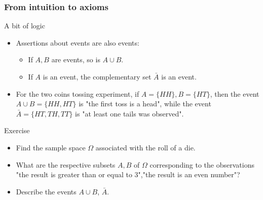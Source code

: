 \documentclass[main.tex]{subfiles}
\begin{document}
\begin{frame}
    \frametitle{From intuition to axioms}
\begin{block}{A bit of logic}
    \begin{itemize}
        \item<+-> Assertions about events are also events:
        \begin{itemize}
            \item<+-> If $A,B$ are events, so is $A \cup B.$
            \item<+-> If $A$ is an event, the complementary set $\bar{A}$ is an event.
        \end{itemize}
        \item<+-> For the two coins tossing experiment, if $A=\{HH\},B=\{HT\}$, then
         the event $A \cup B = \{HH, HT\}$ is "the first toss is a head", while the event
        $\bar{A}=\{HT,TH,TT\}$ is "at least one tails was observed".
    \end{itemize}
\end{block}
\begin{block}{Exercise}
    \begin{itemize}
        \item<+-> Find the sample space $\Omega$ associated with the roll of a die.
        \item<+-> What are the respective subsets $A,B$ of $\Omega$ corresponding to the observations
        "the result is greater than or equal to 3","the result is an even number"?
        \item<+-> Describe the events $A\cup B$, $\bar{A}.$
    \end{itemize}
\end{block}
\end{frame}
\end{document}
